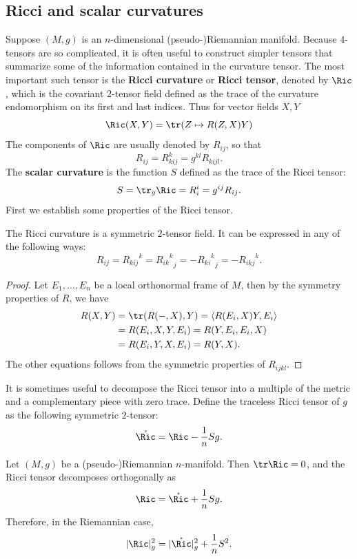 \subsection{Ricci and scalar curvatures}
Suppose $(M,g)$ is an $n$-dimensional (pseudo-)Riemannian manifold. Because $4$-tensors are so complicated, it is often useful to construct simpler tensors that summarize some of the information contained in the curvature tensor. The most important such tensor is the \textbf{Ricci curvature} or \textbf{Ricci tensor}, denoted by $\Ric$, which is the covariant $2$-tensor field defined as the trace of the curvature endomorphism on its first and last indices. Thus for vector fields $X,Y$
\[\Ric(X,Y)=\tr(Z\mapsto R(Z,X)Y)\]
The components of $\Ric$ are usually denoted by $R_{ij}$, so that
\[R_{ij}=R_{kij}^k=g^{kl}R_{kijl}.\]
The \textbf{scalar curvature} is the function $S$ defined as the trace of the Ricci tensor:
\[S=\tr_g\Ric=R_i^i=g^{ij}R_{ij}.\]
First we establish some properties of the Ricci tensor.
\begin{lemma}
The Ricci curvature is a symmetric $2$-tensor field. It can be expressed in any of the following ways:
\[R_{ij}={R_{kij}}^k={{R_{ik}}^k}_j=-{{R_{ki}}^k}_j=-{R_{ikj}}^k.\]
\end{lemma}
\begin{proof}
Let $E_1,\dots,E_n$ be a local orthonormal frame of $M$, then by the symmetry properties of $R$, we have
\begin{align*}
R(X,Y)&=\tr(R(-,X),Y)=\langle R(E_i,X)Y,E_i\rangle\\
&=R(E_i,X,Y,E_i)=R(Y,E_i,E_i,X)\\
&=R(E_i,Y,X,E_i)=R(Y,X).
\end{align*}
The other equations follows from the symmetric properties of $R_{ijkl}$.
\end{proof}
It is sometimes useful to decompose the Ricci tensor into a multiple of the metric and a complementary piece with zero trace. Define the traceless Ricci tensor of $g$ 
as the following symmetric $2$-tensor:
\[\mathring{\Ric}=\Ric-\frac{1}{n}Sg.\]
\begin{proposition}\label{Riemann traceless Ricci}
Let $(M,g)$ be a (pseudo-)Riemannian $n$-manifold. Then $\tr\mathrm{\Ric}=0$, and the Ricci tensor decomposes orthogonally as
\begin{align}\label{Riemann traceless Ricci-1}
\Ric=\mathring{\Ric}+\frac{1}{n}Sg.
\end{align}
Therefore, in the Riemannian case,
\begin{align}\label{Riemann traceless Ricci-2}
|\Ric|_g^2=|\mathring{\Ric}|_g^2+\frac{1}{n}S^2.
\end{align}
\end{proposition}
